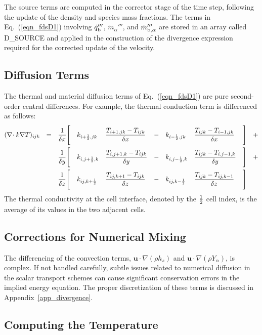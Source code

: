 The source terms are computed in the corrector stage of the time step, following the update of the density and species mass fractions. The terms in Eq.~(\ref{eqn_fdsD1}) involving $\dot{q}_{\rm b}'''$, $\dot{m}_\alpha'''$, and $\dot{m}_{\rm b,\alpha}'''$ are stored in an array called {\ct D\_SOURCE} and applied in the construction of the divergence expression required for the corrected update of the velocity.

\subsection{Diffusion Terms}
\label{div_discret}

The thermal and material diffusion terms of Eq.~(\ref{eqn_fdsD1}) are pure second-order central differences. For example, the thermal
conduction term is differenced as follows:
\begin{align}
(\nabla\!\cdot k \nabla T)_{ijk}
            &&=&&& \frac{1}{\delta x} \Bigg[ && k_{i+\frac{1}{2},jk} && \frac{T_{i+1,jk}-T_{ijk}}{\delta x}  &&-&& k_{i-\frac{1}{2},jk}  && \frac{T_{ijk}-T_{i-1,jk}}{\delta x}  &&\Bigg]  &+ \notag \\
            && &&& \frac{1}{\delta y} \Bigg[ && k_{i,j+\frac{1}{2},k}&& \frac{T_{i,j+1,k}-T_{ijk}}{\delta y} &&-&& k_{i,j-\frac{1}{2},k} && \frac{T_{ijk}-T_{i,j-1,k}}{\delta y} &&\Bigg]  &+ \notag \\
            && &&& \frac{1}{\delta z} \Bigg[ && k_{ij,k+\frac{1}{2}} && \frac{T_{ij,k+1}-T_{ijk}}{\delta z}  &&-&& k_{ij,k-\frac{1}{2}}  && \frac{T_{ijk}-T_{ij,k-1}}{\delta z}  &&\Bigg]  &
\end{align}
The thermal conductivity at the cell interface, denoted by the $\frac{1}{2}$ cell index, is the average of its values in the two adjacent cells.

\subsection{Corrections for Numerical Mixing}

The differencing of the convection terms, $\mathbf{u} \cdot\nabla (\rho h_s)$ and $\mathbf{u} \cdot \nabla (\rho Y_\alpha)$, is complex.  If not handled carefully, subtle issues related to numerical diffusion in the scalar transport schemes can cause significant conservation errors in the implied energy equation.  The proper discretization of these terms is discussed in Appendix~\ref{app_divergence}.

\subsection{Computing the Temperature}

